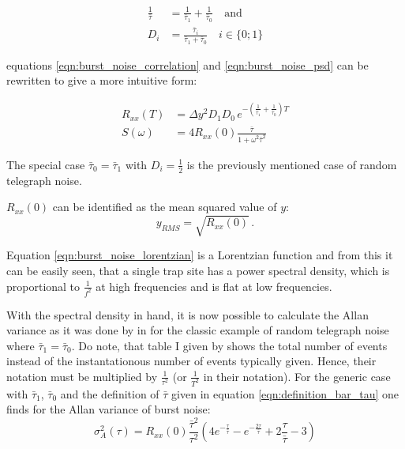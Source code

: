 \begin{align}
    \frac{1}{\bar \tau} &= \frac{1}{\bar \tau_1} + \frac{1}{\bar \tau_0} \quad \mathrm{and} \label{eqn:definition_bar_tau}\\
    D_i &= \frac{\bar \tau_i}{\bar \tau_1 + \bar \tau_0} \quad i \in \{0 ; 1\}
\end{align}

equations \ref{eqn:burst_noise_correlation} and \ref{eqn:burst_noise_psd} can be rewritten to give a more intuitive form:

\begin{align}
    R_{xx} (T) &= \Delta y^2 D_1 D_0 \, e^{-\left(\frac{1}{\bar \tau_1}+\frac{1}{\bar \tau_0}\right)T}\\
    S(\omega) &= 4 R_{xx}(0) \frac{\bar \tau}{1 + \omega^2 \bar \tau^2} \label{eqn:burst_noise_lorentzian}
\end{align}

The special case $\bar \tau_0 = \bar \tau_1$ with $D_i=\frac 1 2$ is the previously mentioned case of random telegraph noise.

$R_{xx} (0)$ can be identified as the mean squared value of $y$:
\begin{equation}
    y_{RMS} = \sqrt{R_{xx}(0)} \,.
\end{equation}

Equation \ref{eqn:burst_noise_lorentzian} is a Lorentzian function and from this it can be easily seen, that a single trap site has a power spectral density, which is proportional to $\frac{1}{f^2}$ at high frequencies and is flat at low frequencies.

With the spectral density in hand, it is now possible to calculate the Allan variance as it was done by \citeauthor{allen_dev_flicker} in \cite{allen_dev_flicker} for the classic example of random telegraph noise where $\bar \tau_1 = \bar \tau_0$. Do note, that table I given by \citeauthor{allen_dev_flicker} shows the total number of events instead of the instantationous number of events typically given. Hence, their notation must be multiplied by $\frac{1}{\tau^2}$ (or $\frac{1}{T^2}$ in their notation). For the generic case with $\bar \tau_1$, $\bar \tau_0$ and the definition of $\bar \tau$ given in equation \ref{eqn:definition_bar_tau} one finds for the Allan variance of burst noise:
\begin{equation}
    \sigma^2_A(\tau) = R_{xx}(0) \frac{\bar \tau^2}{\tau^2} \left(4 e^{-\frac{\tau}{\bar \tau}} - e^{-\frac{2 \tau}{\bar \tau}} + 2 \frac{\tau}{\bar \tau} - 3 \right) \label{eqn:burst_noise_avar}
\end{equation}

